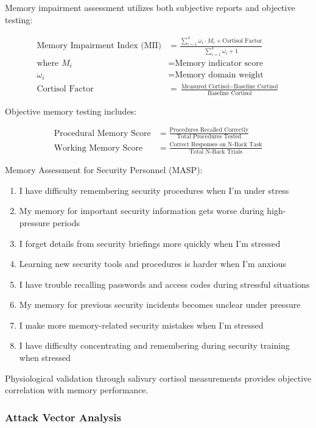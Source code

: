 \documentclass[11pt,a4paper]{article}
\begin{document}
Memory impairment assessment utilizes both subjective reports and objective testing:

\begin{align}
\text{Memory Impairment Index (MII)} &= \frac{\sum_{i=1}^{4} \omega_i \cdot M_i + \text{Cortisol Factor}}{\sum_{i=1}^{4} \omega_i + 1} \\
\text{where } M_i &= \text{Memory indicator score} \\
\omega_i &= \text{Memory domain weight} \\
\text{Cortisol Factor} &= \frac{\text{Measured Cortisol} - \text{Baseline Cortisol}}{\text{Baseline Cortisol}}
\end{align}

Objective memory testing includes:

\begin{align}
\text{Procedural Memory Score} &= \frac{\text{Procedures Recalled Correctly}}{\text{Total Procedures Tested}} \\
\text{Working Memory Score} &= \frac{\text{Correct Responses on N-Back Task}}{\text{Total N-Back Trials}}
\end{align}

Memory Assessment for Security Personnel (MASP):

\begin{enumerate}
\item I have difficulty remembering security procedures when I'm under stress
\item My memory for important security information gets worse during high-pressure periods
\item I forget details from security briefings more quickly when I'm stressed
\item Learning new security tools and procedures is harder when I'm anxious
\item I have trouble recalling passwords and access codes during stressful situations
\item My memory for previous security incidents becomes unclear under pressure
\item I make more memory-related security mistakes when I'm stressed
\item I have difficulty concentrating and remembering during security training when stressed
\end{enumerate}

Physiological validation through salivary cortisol measurements provides objective correlation with memory performance.

\subsubsection{Attack Vector Analysis}
\end{document}
